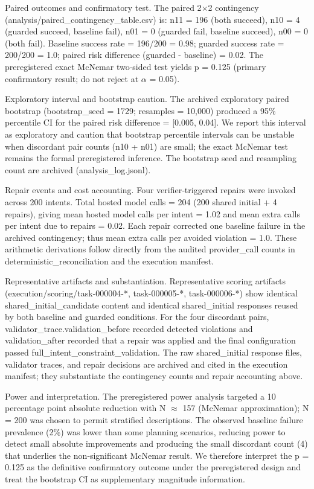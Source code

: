 \documentclass[conference]{IEEEtran}
\begin{document}
Paired outcomes and confirmatory test. The paired 2\ensuremath{\times}2 contingency (analysis/paired\_contingency\_table.csv) is: n11 = 196 (both succeed), n10 = 4 (guarded succeed, baseline fail), n01 = 0 (guarded fail, baseline succeed), n00 = 0 (both fail). Baseline success rate = 196/200 = 0.98; guarded success rate = 200/200 = 1.0; paired risk difference (guarded - baseline) = 0.02. The preregistered exact McNemar two‑sided test yields p = 0.125 (primary confirmatory result; do not reject at \ensuremath{\alpha} = 0.05).

Exploratory interval and bootstrap caution. The archived exploratory paired bootstrap (bootstrap\_seed = 1729; resamples = 10,000) produced a 95\% percentile CI for the paired risk difference = [0.005, 0.04]. We report this interval as exploratory and caution that bootstrap percentile intervals can be unstable when discordant pair counts (n10 + n01) are small; the exact McNemar test remains the formal preregistered inference. The bootstrap seed and resampling count are archived (analysis\_log.jsonl).

Repair events and cost accounting. Four verifier‑triggered repairs were invoked across 200 intents. Total hosted model calls = 204 (200 shared initial + 4 repairs), giving mean hosted model calls per intent = 1.02 and mean extra calls per intent due to repairs = 0.02. Each repair corrected one baseline failure in the archived contingency; thus mean extra calls per avoided violation = 1.0. These arithmetic derivations follow directly from the audited provider\_call counts in deterministic\_reconciliation and the execution manifest.

Representative artifacts and substantiation. Representative scoring artifacts (execution/scoring/task-000004-*, task-000005-*, task-000006-*) show identical shared\_initial\_candidate content and identical shared\_initial responses reused by both baseline and guarded conditions. For the four discordant pairs, validator\_trace.validation\_before recorded detected violations and validation\_after recorded that a repair was applied and the final configuration passed full\_intent\_constraint\_validation. The raw shared\_initial response files, validator traces, and repair decisions are archived and cited in the execution manifest; they substantiate the contingency counts and repair accounting above.

Power and interpretation. The preregistered power analysis targeted a 10 percentage point absolute reduction with N \ensuremath{\approx} 157 (McNemar approximation); N = 200 was chosen to permit stratified descriptions. The observed baseline failure prevalence (2\%) was lower than some planning scenarios, reducing power to detect small absolute improvements and producing the small discordant count (4) that underlies the non‑significant McNemar result. We therefore interpret the p = 0.125 as the definitive confirmatory outcome under the preregistered design and treat the bootstrap CI as supplementary magnitude information.
\end{document}
